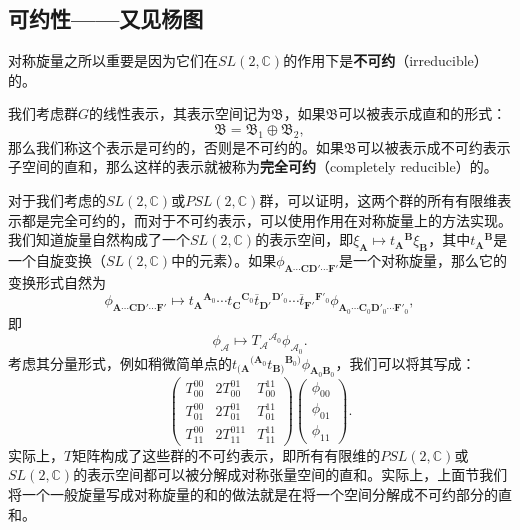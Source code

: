 \subsection{可约性——又见杨图}

对称旋量之所以重要是因为它们在$SL( 2,\mathbb{C})$的作用下是\textbf{不可约}（irreducible）的。



我们考虑群$G$的线性表示，其表示空间记为$\mathfrak{B}$，如果$\mathfrak{B}$可以被表示成直和的形式：
\begin{equation*}
	\mathfrak{B} =\mathfrak{B}_{1} \oplus \mathfrak{B}_{2} ,
\end{equation*}
那么我们称这个表示是可约的，否则是不可约的。如果$\mathfrak{B}$可以被表示成不可约表示子空间的直和，那么这样的表示就被称为\textbf{完全可约}（completely reducible）的。



对于我们考虑的$SL( 2,\mathbb{C})$或$PSL( 2,\mathbb{C})$群，可以证明，这两个群的所有有限维表示都是完全可约的，而对于不可约表示，可以使用作用在对称旋量上的方法实现。我们知道旋量自然构成了一个$SL( 2,\mathbb{C})$的表示空间，即$\xi _{\boldsymbol{A}} \mapsto t{_{\boldsymbol{A}}}^{\boldsymbol{B}} \xi _{\boldsymbol{B}}$，其中$t{_{\boldsymbol{A}}}^{\boldsymbol{B}}$是一个自旋变换（$SL( 2,\mathbb{C})$中的元素）。如果$\phi _{\boldsymbol{A} \cdots \boldsymbol{CD} '\cdots \boldsymbol{F} '}$是一个对称旋量，那么它的变换形式自然为
\begin{equation*}
	\phi _{\boldsymbol{A} \cdots \boldsymbol{CD} '\cdots \boldsymbol{F} '} \mapsto t{_{\boldsymbol{A}}}^{\boldsymbol{A}_{0}} \cdots t{_{\boldsymbol{C}}}^{\boldsymbol{C}_{0}}\overline{t}{_{\boldsymbol{D} '}}^{\boldsymbol{D} '_{0}} \cdots \overline{t}{_{\boldsymbol{F} '}}^{\boldsymbol{F} '_{0}} \phi _{\boldsymbol{A}_{0} \cdots \boldsymbol{C}_{0}\boldsymbol{D} '_{0} \cdots \boldsymbol{F} '_{0}} ,
\end{equation*}
即
\begin{equation*}
	\phi _{\mathcal{A}} \mapsto T{_{\mathcal{A}}}^{\mathcal{A}_{0}} \phi _{\mathcal{A}_{0}} .
\end{equation*}
考虑其分量形式，例如稍微简单点的$t{_{(\boldsymbol{A}}}^{(\boldsymbol{A}_{0}} t{_{\boldsymbol{B})}}^{\boldsymbol{B}_{0})} \phi _{\boldsymbol{A}_{0}\boldsymbol{B}_{0}}$，我们可以将其写成：
\begin{equation*}
	\left(\begin{matrix}
		T_{00}^{00} & 2T_{00}^{01} & T_{00}^{11}\\
		T_{01}^{00} & 2T_{01}^{01} & T_{01}^{11}\\
		T_{11}^{00} & 2T_{11}^{011} & T_{11}^{11}
	\end{matrix}\right)\left(\begin{matrix}
		\phi _{00}\\
		\phi _{01}\\
		\phi _{11}
	\end{matrix}\right) .
\end{equation*}
实际上，$T$矩阵构成了这些群的不可约表示，即所有有限维的$PSL( 2,\mathbb{C})$或$SL( 2,\mathbb{C})$的表示空间都可以被分解成对称张量空间的直和。实际上，上面节我们将一个一般旋量写成对称旋量的和的做法就是在将一个空间分解成不可约部分的直和。



